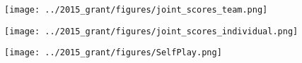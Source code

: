 \begin{figure}
\centering
\begin{minipage}{0.3\textwidth}
\texttt{[image: ../2015\_grant/figures/joint\_scores\_team.png]}
\label{fig:joint_scores_coordinated}
\end{minipage}%
\hspace{0.04\textwidth}
\begin{minipage}{0.3\textwidth}
\texttt{[image: ../2015\_grant/figures/joint\_scores\_individual.png]}
\label{fig:joint_scores_uncoordinated}
\end{minipage}%
\hspace{0.04\textwidth}
\begin{minipage}{0.3\textwidth}
\texttt{[image: ../2015\_grant/figures/SelfPlay.png]}
\label{f:selfplay}
\end{minipage}
\end{figure}
